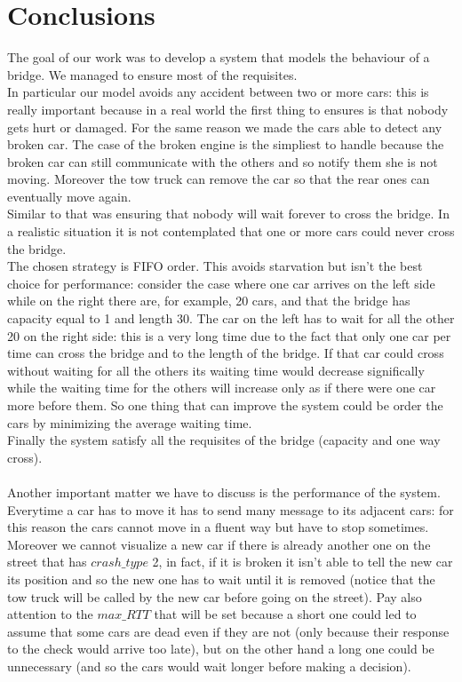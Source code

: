 \chapter{Conclusions}\label{ch:conclusions}

The goal of our work was to develop a system that models the behaviour of a bridge. We managed to ensure
most of the requisites.\\ In particular our model avoids any accident between two or more cars: this is 
really important because in a real world the first thing to ensures is that nobody gets hurt or damaged. 
For the same reason we made the cars able to detect any broken car. The case of the broken engine is the simpliest
to handle because the broken car can still communicate with the others and so notify them she is not moving.
Moreover the tow truck can remove the car so that the rear ones can eventually move again.\\ Similar to that
was ensuring that nobody will wait forever to cross the bridge. In a realistic situation it is not contemplated
that one or more cars could never cross the bridge.\\
The chosen strategy is FIFO order. This avoids starvation but isn't the best choice for performance: consider
the case where one car arrives on the left side while on the right there are, for example, 20 cars, and that the bridge
has capacity equal to 1 and length 30. The car on the left has to wait for all the other 20 on the right side: this 
is a very long time due to the fact that only one car per time can cross the bridge and to the length of the bridge.
If that car could cross without waiting for all the others its waiting time would decrease significally while
the waiting time for the others will increase only as if there were one car more before them. So one thing 
that can improve the system could be order the cars by minimizing the average waiting time.\\
Finally the system satisfy all the requisites of the bridge (capacity and one way cross).\\ \\

Another important matter we have to discuss is the performance of the system. Everytime a car has to move 
it has to send many message to its adjacent cars: for this reason the cars cannot move in a fluent way
but have to stop sometimes. Moreover we cannot visualize a new car if there is already another one on the 
street that has $crash\_type$ 2, in fact, if it is broken it isn't able to tell the new car its position and
so the new one has to wait until it is removed (notice that the tow truck will be called by the new car before
going on the street).
Pay also attention to the $max\_RTT$ that will be set because a short one could led to assume that some cars
are dead even if they are not (only because their response to the check would arrive too late), but on the other
hand a long one could be unnecessary (and so the cars would wait longer before making a decision).\\

